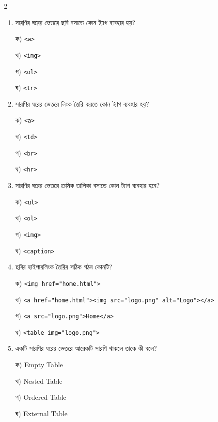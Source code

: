 \begin{multicols}{2}
\begin{enumerate}[leftmargin=*,itemsep=5pt]
\item \begin{minipage}[t]{\linewidth}\vspace{0pt}
সারণির ঘরের ভেতরে ছবি বসাতে কোন ট্যাগ ব্যবহার হয়?
\par ক) \texttt{<a>}
\par খ) \texttt{<img>}
\par গ) \texttt{<ol>}
\par ঘ) \texttt{<tr>}
\end{minipage}

\item \begin{minipage}[t]{\linewidth}\vspace{0pt}
সারণির ঘরের ভেতরে লিংক তৈরি করতে কোন ট্যাগ ব্যবহার হয়?
\par ক) \texttt{<a>}
\par খ) \texttt{<td>}
\par গ) \texttt{<br>}
\par ঘ) \texttt{<hr>}
\end{minipage}

\item \begin{minipage}[t]{\linewidth}\vspace{0pt}
সারণির ঘরের ভেতরে ক্রমিক তালিকা বসাতে কোন ট্যাগ ব্যবহার হবে?
\par ক) \texttt{<ul>}
\par খ) \texttt{<ol>}
\par গ) \texttt{<img>}
\par ঘ) \texttt{<caption>}
\end{minipage}

\item \begin{minipage}[t]{\linewidth}\vspace{0pt}
ছবির হাইপারলিংক তৈরির সঠিক গঠন কোনটি?
\par ক) \texttt{<img href="home.html">}
\par খ) \texttt{<a href="home.html"><img src="logo.png" alt="Logo"></a>}
\par গ) \texttt{<a src="logo.png">Home</a>}
\par ঘ) \texttt{<table img="logo.png">}
\end{minipage}

\item \begin{minipage}[t]{\linewidth}\vspace{0pt}
একটি সারণির ঘরের ভেতরে আরেকটি সারণি থাকলে তাকে কী বলে?
\par ক) Empty Table
\par খ) Nested Table
\par গ) Ordered Table
\par ঘ) External Table
\end{minipage}
\end{enumerate}
\end{multicols}

